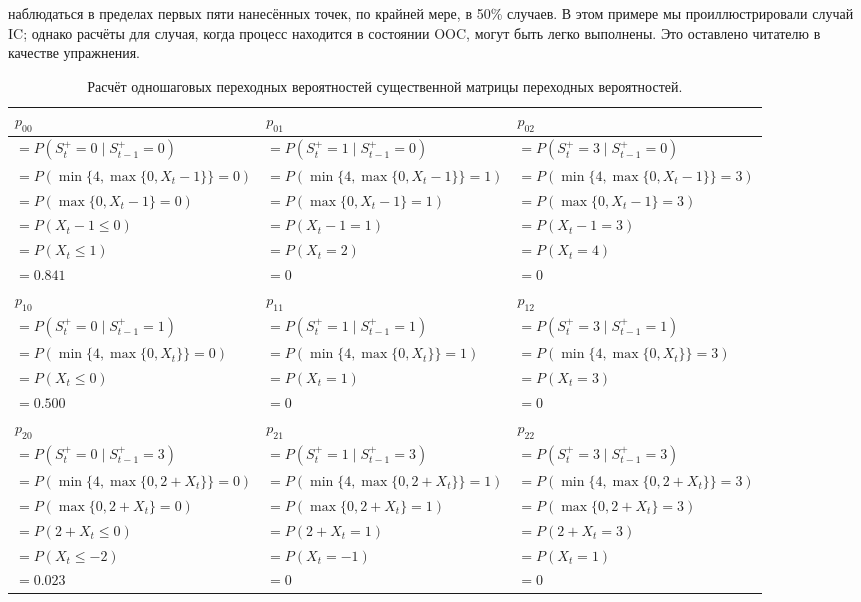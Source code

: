 наблюдаться в пределах первых пяти нанесённых точек, по крайней мере, в 50\% случаев. В этом примере мы проиллюстрировали случай IC; однако расчёты для случая, когда процесс находится в состоянии OOC, могут быть легко выполнены. Это оставлено читателю в качестве упражнения.

\begin{table}[htbp]
	\centering
	\caption{Расчёт одношаговых переходных вероятностей существенной матрицы переходных вероятностей.}
	\label{tab:3.11}
	\renewcommand{\arraystretch}{1.3} %
	\small %
	\begin{tabular}{lll}
		\toprule
		\(p_{00}\) & \(p_{01}\) & \(p_{02}\) \\
		\midrule
		\(= P(S_t^+ = 0 \mid S_{t-1}^+ = 0)\) & \(= P(S_t^+ = 1 \mid S_{t-1}^+ = 0)\) & \(= P(S_t^+ = 3 \mid S_{t-1}^+ = 0)\) \\
		\(= P(\min\{4, \max\{0, X_t - 1\}\} = 0)\) & \(= P(\min\{4, \max\{0, X_t - 1\}\} = 1)\) & \(= P(\min\{4, \max\{0, X_t - 1\}\} = 3)\) \\
		\(= P(\max\{0, X_t - 1\} = 0)\) & \(= P(\max\{0, X_t - 1\} = 1)\) & \(= P(\max\{0, X_t - 1\} = 3)\) \\
		\(= P(X_t - 1 \leq 0)\) & \(= P(X_t - 1 = 1)\) & \(= P(X_t - 1 = 3)\) \\
		\(= P(X_t \leq 1)\) & \(= P(X_t = 2)\) & \(= P(X_t = 4)\) \\
		\(= 0.841\) & \(= 0\) & \(= 0\) \\
		\midrule
		\(p_{10}\) & \(p_{11}\) & \(p_{12}\) \\
		\midrule
		\(= P(S_t^+ = 0 \mid S_{t-1}^+ = 1)\) & \(= P(S_t^+ = 1 \mid S_{t-1}^+ = 1)\) & \(= P(S_t^+ = 3 \mid S_{t-1}^+ = 1)\) \\
		\(= P(\min\{4, \max\{0, X_t\}\} = 0)\) & \(= P(\min\{4, \max\{0, X_t\}\} = 1)\) & \(= P(\min\{4, \max\{0, X_t\}\} = 3)\) \\
		\(= P(X_t \leq 0)\) & \(= P(X_t = 1)\) & \(= P(X_t = 3)\) \\
		\(= 0.500\) & \(= 0\) & \(= 0\) \\
		\midrule
		\(p_{20}\) & \(p_{21}\) & \(p_{22}\) \\
		\midrule
		\(= P(S_t^+ = 0 \mid S_{t-1}^+ = 3)\) & \(= P(S_t^+ = 1 \mid S_{t-1}^+ = 3)\) & \(= P(S_t^+ = 3 \mid S_{t-1}^+ = 3)\) \\
		\(= P(\min\{4, \max\{0, 2 + X_t\}\} = 0)\) & \(= P(\min\{4, \max\{0, 2 + X_t\}\} = 1)\) & \(= P(\min\{4, \max\{0, 2 + X_t\}\} = 3)\) \\
		\(= P(\max\{0, 2 + X_t\} = 0)\) & \(= P(\max\{0, 2 + X_t\} = 1)\) & \(= P(\max\{0, 2 + X_t\} = 3)\) \\
		\(= P(2 + X_t \leq 0)\) & \(= P(2 + X_t = 1)\) & \(= P(2 + X_t = 3)\) \\
		\(= P(X_t \leq -2)\) & \(= P(X_t = -1)\) & \(= P(X_t = 1)\) \\
		\(= 0.023\) & \(= 0\) & \(= 0\) \\
		\bottomrule
	\end{tabular}
\end{table}

